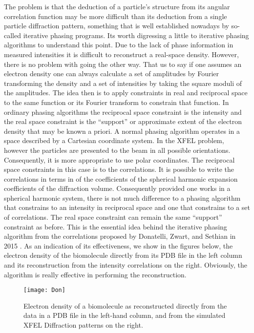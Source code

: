 The problem is that the deduction of a particle’s structure from its angular correlation function may be more difficult than its deduction from a single particle diffraction pattern, something that is well established nowadays by so-called iterative phasing programs. Its worth digressing a little to iterative phasing algorithms to understand this point. Due to the lack of phase information in measured intensities it is difficult to reconstruct a real-space density. However, there is no problem with going the other way. That us to say if one assumes an electron density one can always calculate a set of amplitudes by Fourier transforming the density and a set of intensities by taking the square moduli of the amplitudes. The idea then is to apply constraints in real and reciprocal space to the same function or its Fourier transform to constrain that function. In ordinary phasing algorithms the reciprocal space constraint is the intensity and the real space constraint is the “support” or approximate extent of the electron density that may be known a priori. A normal phasing algorithm operates in a space described by a Cartesian coordinate system. In the XFEL problem, however the particles are presented to the beam in all possible orientations. Consequently, it is more appropriate to use polar coordinates. The reciprocal space constraints in this case is to the correlations. It is possible to write the correlations in terms in of the coefficients of the spherical harmonic expansion coefficients of the diffraction volume. Consequently provided one works in a spherical harmonic system, there is not much difference to a phasing algorithm that constrains to an intensity in reciprocal space and one that constrains to a set of correlations. The real space constraint can remain the same “support” constraint as before. This is the essential idea behind the iterative phasing algorithm from the correlations proposed by Donatelli, Zwart, and Sethian in 2015 \cite{Donatelli}. As an indication of its effectiveness, we show in the figures below, the electron density of the biomolecule directly from its PDB file in the left column and its reconstruction from the intensity correlations on the right. Obviously, the algorithm is really effective in performing the reconstruction. 

\begin{figure}[ht]
  \centering
  \texttt{[image: Don]}
\caption{Electron density of a biomolecule as reconstructed directly from  the data in a PDB file in the left-hand column, and from the simulated XFEL Diffraction patterns on the right\cite{Donatelli}.}
\label{fig:Don}
\end{figure}

